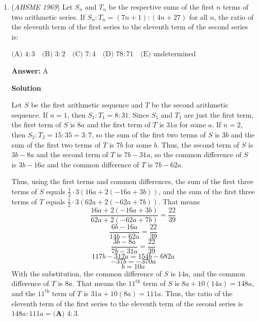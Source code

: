 \begin{enumerate}
 \begin{verbatim}
Note: Solving the system is extra work, as the answer is described by the first equation. The sum of the coefficients ($a + b + c$) is just 5 by the first equation.
\end{verbatim}




	\item (\textit{AHSME 1969}) Let $S_n$ and $T_n$ be the respective sums of the first $n$ terms of two arithmetic series. If $S_n:T_n=(7n+1):(4n+27)$ for all $n$, the ratio of the eleventh term of the first series to the eleventh term of the second series is:


 $\text{(A) } 4:3\quad \text{(B) } 3:2\quad \text{(C) } 7:4\quad \text{(D) } 78:71\quad \text{(E) undetermined}$

 \textbf{Answer: }A



\textbf{Solution}

Let $S$ be the first arithmetic sequence and $T$ be the second arithmetic sequence.  If $n = 1$, then $S_1:T_1 = 8:31$.  Since $S_1$ and $T_1$ are just the first term, the first term of $S$ is $8a$ and the first term of $T$ is $31a$ for some $a$.  If $n = 2$, then $S_2:T_2 = 15:35 = 3:7$, so the sum of the first two terms of $S$ is $3b$ and the sum of the first two terms of $T$ is $7b$ for some $b$.  Thus, the second term of $S$ is $3b-8a$ and the second term of $T$ is $7b - 31a$, so the common difference of $S$ is $3b-16a$ and the common difference of $T$ is $7b-62a$.

 Thus, using the first terms and common differences, the sum of the first three terms of $S$ equals $\frac{1}{2} \cdot 3(16a + 2(-16a + 3b))$, and the sum of the first three terms of $T$ equals $\frac{1}{2} \cdot 3(62a + 2(-62a + 7b))$.  That means
 \[\frac{16a + 2(-16a + 3b)}{62a + 2(-62a + 7b)} = \frac{22}{39}\]
 \[\frac{6b-16a}{14b-62a} = \frac{22}{39}\]
 \[\frac{3b-8a}{7b-31a} = \frac{22}{39}\]
 \[117b - 312a = 154b - 682a\]
 \[-37b = -370a\]
 \[b = 10a\]With the substitution, the common difference of $S$ is $14a$, and the common difference of $T$ is $8a$.  That means the $11^\text{th}$ term of $S$ is $8a + 10(14a) = 148a$, and the $11^\text{th}$ term of $T$ is $31a + 10(8a) = 111a$.  Thus, the ratio of the eleventh term of the first series to the eleventh term of the second series is $148a:111a = \boxed{\textbf{(A) } 4:3}$.

 




\end{enumerate}

